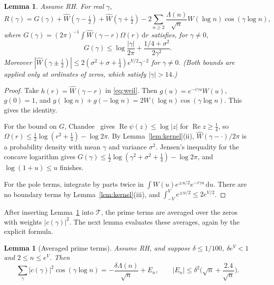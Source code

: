 \documentclass[11pt]{amsart}
\newtheorem{lemma}[theorem]{Lemma}
\theoremstyle{remark}
\newcommand{\dd}{\,\mathrm{d}}
\newcommand{\re}{\operatorname{Re}}
\newcommand{\Wh}{\widehat W}
\begin{document}
\begin{lemma}\label{lem:R}
Assume RH. For real $\gamma$,
\[
R(\gamma)=G(\gamma)+\Wh(\gamma-\tfrac i2)+\Wh(\gamma+\tfrac i2)-2\sum_{n\ge2}\frac{\Lambda(n)}{\sqrt n}W(\log n)\cos(\gamma\log n),
\]
where $G(\gamma)=(2\pi)^{-1}\int\Wh(\gamma-r)\Omega(r)\dd r$ satisfies, for $\gamma\ne0$,
\[
G(\gamma)\le\log\frac{|\gamma|}{2\pi}+\frac{1/4+\sigma^2}{2\gamma^2}.
\]
Moreover $|\Wh(\gamma\pm\frac i2)|\le2(\sigma^2+\sigma+\frac14)e^{V/2}\gamma^{-2}$ for $\gamma\ne0$. (Both bounds are applied only at ordinates of zeros, which satisfy $|\gamma|>14$.)
\end{lemma}

\begin{proof}
Take $h(r)=\Wh(\gamma-r)$ in \eqref{eq:weil}. Then $g(u)=e^{-i\gamma u}W(u)$, $g(0)=1$, and $g(\log n)+g(-\log n)=2W(\log n)\cos(\gamma\log n)$. This gives the identity.

For the bound on $G$, Chandee~\cite[Lemma~2.3]{Chandee} gives $\re\psi(z)\le\log|z|$ for $\re z\ge\frac14$, so $\Omega(r)\le\frac12\log(r^2+\frac14)-\log2\pi$. By Lemma~\ref{lem:kernel}(ii), $\Wh(\gamma-\cdot)/2\pi$ is a probability density with mean $\gamma$ and variance $\sigma^2$. Jensen's inequality for the concave logarithm gives $G(\gamma)\le\frac12\log(\gamma^2+\sigma^2+\frac14)-\log2\pi$, and $\log(1+u)\le u$ finishes.

For the pole terms, integrate by parts twice in $\int W(u)e^{\pm u/2}e^{-i\gamma u}\dd u$. There are no boundary terms by Lemma~\ref{lem:kernel}(iii), and $\int_{-V}^Ve^{\pm u/2}\le2e^{V/2}$.
\end{proof}

After inserting Lemma~\ref{lem:R} into $\mathcal T$, the prime terms are averaged over the zeros with weights $|c(\gamma)|^2$. The next lemma evaluates these averages, again by the explicit formula.

\begin{lemma}[Averaged prime terms]\label{lem:En}
Assume RH, and suppose $\delta\le1/100$, $\delta e^V<1$ and $2\le n\le e^V$. Then
\[
\sum_\gamma|c(\gamma)|^2\cos(\gamma\log n)=-\frac{\delta\Lambda(n)}{\sqrt n}+E_n,\qquad |E_n|\le\delta^2\Big(\sqrt n+\frac{2.4}{\sqrt n}\Big).
\]
\end{lemma}
\end{document}
